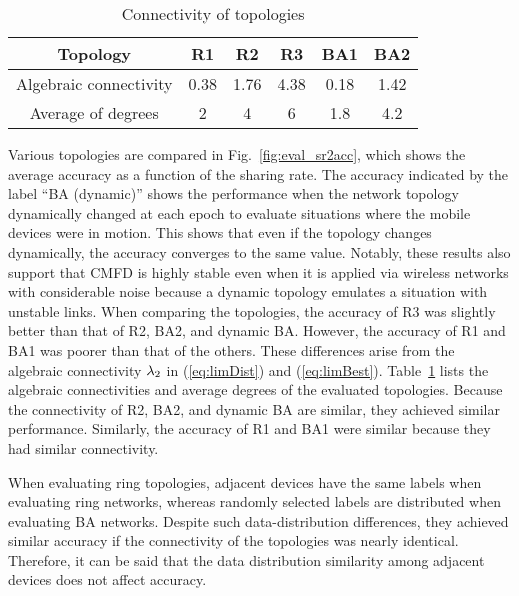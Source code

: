 \documentclass[journal]{IEEEtran}
\begin{document}
\begin{table}[!t]
\caption{Connectivity of topologies}
\label{tbl:connectivity}
\centering
\begin{tabular}{cccccc}
\toprule
Topology & R1 & R2 & R3 & BA1 & BA2 \\
\midrule
Algebraic connectivity & 0.38 & 1.76 & 4.38 & 0.18 & 1.42 \\
Average of degrees & 2 & 4 & 6 & 1.8 & 4.2 \\
\bottomrule
\end{tabular}
\end{table}

Various topologies are compared in Fig.~\ref{fig:eval_sr2acc}, which shows the average accuracy as a function of the sharing rate.
The accuracy indicated by the label ``BA (dynamic)'' shows the performance when the network topology dynamically changed at each epoch
to evaluate situations where the mobile devices were in motion.
This shows that even if the topology changes dynamically, the accuracy converges to the same value.
Notably, these results also support that \gls{CMFD} is highly stable even when it is applied via wireless networks with considerable noise
because a dynamic topology emulates a situation with unstable links.
When comparing the topologies, the accuracy of R3 was slightly better than that of R2, BA2, and dynamic BA.
However, the accuracy of R1 and BA1 was poorer than that of the others.
These differences arise from the algebraic connectivity $\lambda_2$ in (\ref{eq:limDist}) and (\ref{eq:limBest}).
Table~\ref{tbl:connectivity} lists the algebraic connectivities and average degrees of the evaluated topologies.
Because the connectivity of R2, BA2, and dynamic BA are similar, they achieved similar performance.
Similarly, the accuracy of R1 and BA1 were similar because they had similar connectivity.

When evaluating ring topologies, adjacent devices have the same labels when evaluating ring networks,
whereas randomly selected labels are distributed when evaluating \gls{BA} networks.
Despite such data-distribution differences, they achieved similar accuracy if the connectivity of the topologies was nearly identical.
Therefore, it can be said that the data distribution similarity among adjacent devices does not affect accuracy.
\end{document}
